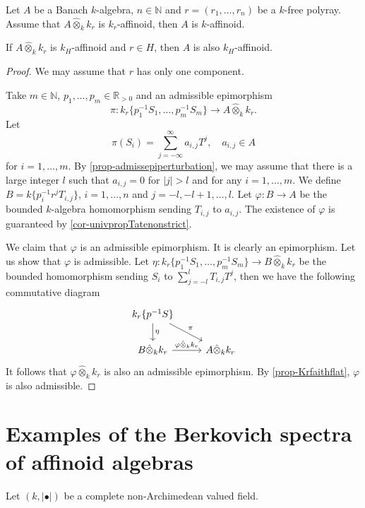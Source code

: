 \begin{corollary}\label{cor-affkhann}
    Let $A$ be a Banach $k$-algebra, $n\in \mathbb{N}$ and $r=(r_1,\ldots,r_n)$ be a $k$-free polyray. Assume that $A\hat{\otimes}_k k_r$ is $k_r$-affinoid, then $A$ is $k$-affinoid.

    If $A\hat{\otimes}_k k_r$ is $k_H$-affinoid and $r\in H$, then $A$ is also $k_H$-affinoid. 
\end{corollary}
\begin{proof}
    We may assume that $r$ has only one component.

    Take $m\in \mathbb{N}$, $p_1,\ldots,p_m\in \mathbb{R}_{>0}$ and an admissible epimorphism
    \[
        \pi:k_r\{p_1^{-1}S_1,\ldots,p_{m}^{-1}S_m\}\rightarrow  A\hat{\otimes}_k k_r. 
    \]
    Let 
    \[
        \pi(S_i)=\sum_{j=-\infty}^{\infty} a_{i,j}T^j,\quad a_{i,j}\in A  
    \]
    for $i=1,\ldots,m$. By \cref{prop-admissepiperturbation}, we may assume that there is a large integer $l$ such that $a_{i,j}=0$ for $|j|>l$ and for any $i=1,\ldots,m$. We define $B=k\{p_i^{-1}r^jT_{i,j}\}$, $i=1,\ldots,n$ and $j=-l,-l+1,\ldots,l$. Let $\varphi:B\rightarrow A$ be the bounded $k$-algebra homomorphism sending $T_{i,j}$ to $a_{i,j}$. The existence of $\varphi$ is guaranteed by \cref{cor-univpropTatenonstrict}.

    We claim that $\varphi$ is an admissible epimorphism. It is clearly an epimorphism. Let us show that $\varphi$ is admissible. Let $\eta:k_r\{p_1^{-1}S_1,\ldots,p_{m}^{-1}S_m\}\rightarrow B\hat{\otimes}_k k_r$ be the bounded homomorphism sending $S_i$ to $\sum_{j=-l}^l T_{i,j}T^j$, then we have the following commutative diagram
    \[
        \begin{tikzcd}
            k_r\{p^{-1}S\} \arrow[rd, "\pi"] \arrow[d, "\eta"]           &                      \\
            B\hat{\otimes}_k k_r \arrow[r, "\varphi\hat{\otimes}_k k_r"] & A\hat{\otimes}_k k_r
        \end{tikzcd}  
    \]
    It follows that $\varphi\hat{\otimes}_k k_r$ is also an admissible epimorphism. By  \cref{prop-Krfaithflat}, $\varphi$ is also admissible.
\end{proof}

\section{Examples of the Berkovich spectra of affinoid algebras}
Let $(k,|\bullet|)$ be a complete non-Archimedean valued field.

